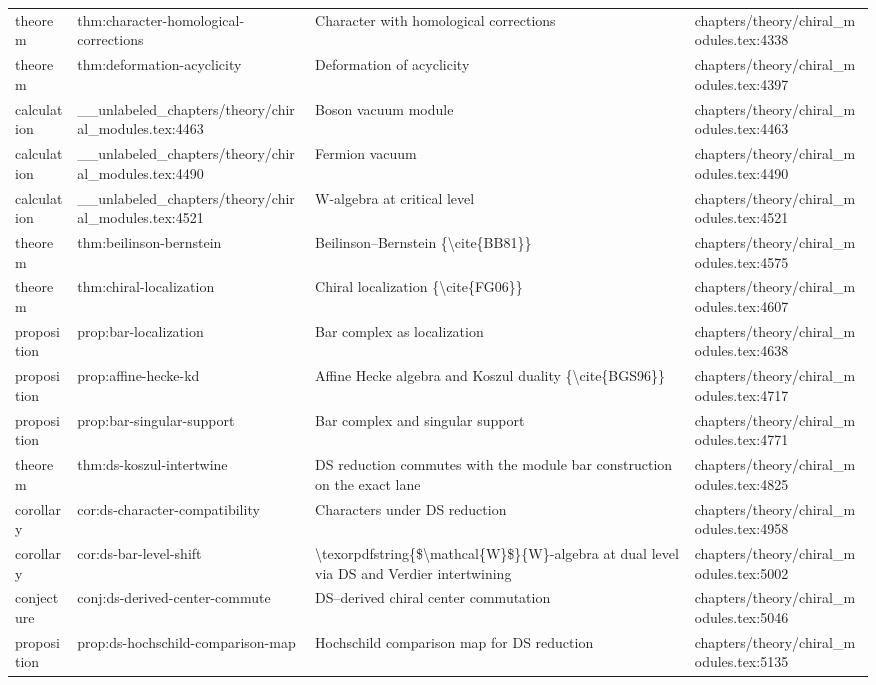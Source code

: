 \documentclass[11pt]{article}
\begin{document}
\begin{longtable}{L{0.10\textwidth}L{0.26\textwidth}L{0.42\textwidth}L{0.22\textwidth}}
theorem & thm:character-homological-corrections & Character with homological corrections & chapters/theory/chiral\_modules.tex:4338\\
theorem & thm:deformation-acyclicity & Deformation of acyclicity & chapters/theory/chiral\_modules.tex:4397\\
calculation & \_\_unlabeled\_chapters/theory/chiral\_modules.tex:4463 & Boson vacuum module & chapters/theory/chiral\_modules.tex:4463\\
calculation & \_\_unlabeled\_chapters/theory/chiral\_modules.tex:4490 & Fermion vacuum & chapters/theory/chiral\_modules.tex:4490\\
calculation & \_\_unlabeled\_chapters/theory/chiral\_modules.tex:4521 & W-algebra at critical level & chapters/theory/chiral\_modules.tex:4521\\
theorem & thm:beilinson-bernstein & Beilinson--Bernstein \{\textbackslash{}cite\{BB81\}\} & chapters/theory/chiral\_modules.tex:4575\\
theorem & thm:chiral-localization & Chiral localization \{\textbackslash{}cite\{FG06\}\} & chapters/theory/chiral\_modules.tex:4607\\
proposition & prop:bar-localization & Bar complex as localization & chapters/theory/chiral\_modules.tex:4638\\
proposition & prop:affine-hecke-kd & Affine Hecke algebra and Koszul duality \{\textbackslash{}cite\{BGS96\}\} & chapters/theory/chiral\_modules.tex:4717\\
proposition & prop:bar-singular-support & Bar complex and singular support & chapters/theory/chiral\_modules.tex:4771\\
theorem & thm:ds-koszul-intertwine & DS reduction commutes with the module bar construction on the exact lane & chapters/theory/chiral\_modules.tex:4825\\
corollary & cor:ds-character-compatibility & Characters under DS reduction & chapters/theory/chiral\_modules.tex:4958\\
corollary & cor:ds-bar-level-shift & \textbackslash{}texorpdfstring\{\$\textbackslash{}mathcal\{W\}\$\}\{W\}-algebra at dual level via DS and Verdier intertwining & chapters/theory/chiral\_modules.tex:5002\\
conjecture & conj:ds-derived-center-commute & DS--derived chiral center commutation & chapters/theory/chiral\_modules.tex:5046\\
proposition & prop:ds-hochschild-comparison-map & Hochschild comparison map for DS reduction & chapters/theory/chiral\_modules.tex:5135\\

\end{longtable}
\end{document}
